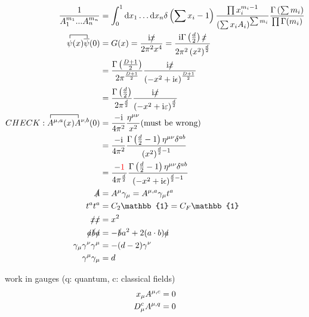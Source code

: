 \begin{align}
\frac{1}{A_1^{m_1}...A_n^{m_n}} 
&= \int_{0}^{1} \dx x_1 \dots \dx x_n \delta\left(\sum x_i -1\right) \frac{\prod x_i^{m_i-1}}{\left(\sum x_iA_i\right)^{\sum m_i}}\frac{\Gamma\left(\sum m_i\right)}{\prod \Gamma(m_i)}
\label{denominatorproductAsIntegral}
\\
\contraction{}{\psi}{(x)}{\overline{\psi}}\psi (x) \overline \psi (0) 
&=
\gf(x)= \frac{\imag \slashed{x}}{2\pi^2x^4}
= \frac{\imag \Gamma\left({\frac{d}{2}}\right) \slashed{x}}{2\pi^2\left(x^2\right)^\frac{d}{2}}
\\
&=
\frac{\Gamma\left(\frac{D+1}{2}\right)}{2\pi^{\frac{D+1}{2}}}\frac{\imag \slashed x}{\left(-x^2+\imag \epsilon\right)^{\frac{D+1}{2}}}
\\
&=
\frac{\Gamma\left(\frac{d}{2}\right)}{2\pi^{\frac{d}{2}}}\frac{\imag \slashed x}{\left(-x^2+\imag \varepsilon\right)^{\frac{d}{2}}}
\\
CHECK: \contraction{}{A}{^{\mu,a}(x)}{\overline{A}} A^{\mu,a}(x)A^{\nu,b}(0) 
&= \frac{-\imag}{4 \pi^2} \frac{\metric^{\mu \nu}}{x^2} \text{(must be wrong)}
\\
&=
\frac{-\imag}{4 \pi^2} \frac{\Gamma\left(\frac{d}{2}-1\right)\metric^{\mu \nu}\delta^{ab}}{\left(x^2\right)^{\frac{d}{2}-1}} 
\\
&=
\frac{-\color{red}{1}}{4 \pi^{\frac{d}{2}}} \frac{\Gamma\left(\frac{d}{2}-1\right)\metric^{\mu \nu}\delta^{ab}}{\left(-x^2+\imag\epsilon\right)^{\frac{d}{2}-1}} 
\\
\slashed A &= A^\mu \gamma_\mu = A^{\mu,a} \gamma_\mu t^a
\\
t^a t^a &= C_2 \mathbb{1}  = C_F \mathbb{1}
\\
\slashed x \slashed x 
&= x^2
\\
\slashed a \slashed b \slashed a 
&=
- \slashed b a^2 +2 \skpt{a}{b}\slashed a
\\
\gamma_\mu \gamma^\nu \gamma^\mu 
&=
-(d-2)\gamma^\nu
\\
\gamma^\mu \gamma_\mu 
&=
d
\end{align}

work in gauges (q: quantum, c: classical fields)
\begin{align}
x_{\mu} A^{\mu,c} = 0
\\
D_\mu^{c} A^{\mu,q} = 0
\end{align}











\ifdefined\mainprogram{}
\else

\fi